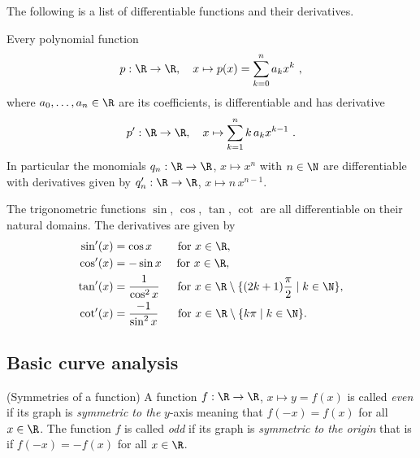 \begin{examples}
The following is a list of differentiable functions and their derivatives.
\begin{letterlist}
\item
  Every polynomial function 
  \[ 
    p:\R\to\R, \quad x \mapsto p(x)= \sum_{k=0}^n a_k x^k \ ,       
  \]
  where $a_0,\ldots, a_n \in \R$ are its coefficients, 
  is differentiable and has derivative 
  \[
     p' : \R \to \R, \quad x \mapsto \sum_{k=1}^n k \, a_k x^{k-1} \ .
  \]
  In particular the monomials $q_n: \R \to \R$, $x \mapsto x^n$ with $n\in \N$  
  are differentiable with derivatives given by 
  $q_n': \R \to\R$, $x \mapsto n \, x^{n-1}$. 
\item 
  The trigonometric functions $\sin$, $\cos$, $\tan$, $\cot$ are all 
  differentiable on their natural domains. The derivatives are given 
  by
  \begin{equation*}
  \begin{split}
    \sin'(x) & = \cos x  \hspace{8mm}  \text{for } x \in \R,\\
    \cos'(x) & = -\sin x    \hspace{4.7mm} \text{for } x \in \R,\\
    \tan'(x) & = \frac{1}{\cos^2 x}   \hspace{5.5mm} \text{for } x \in 
    \R \setminus \{ (2k+1)\frac{\pi}{2} \mid k \in \N \}, \\
    \cot'(x) & = \frac{-1}{\sin^2 x}   \hspace{6mm} \text{for } x \in 
    \R \setminus \{ k \pi \mid k \in \N \}.
  \end{split}
  \end{equation*}
\end{letterlist}
\end{examples}

\subsection{Basic curve analysis}

\begin{definition} (Symmetries of a function)
  A function $f:\R \to \R$, $x \mapsto y =f(x)$ is called \emph{even} if its 
  graph is \emph{symmetric to the} $y$-axis meaning that 
  $f(-x)=f(x)$ for all $x\in \R$. 
  The function $f$ is called  \emph{odd} if its graph is 
  \emph{symmetric to the origin} that is if $f(-x)=-f(x)$ for all $x\in \R$.
\end{definition}

